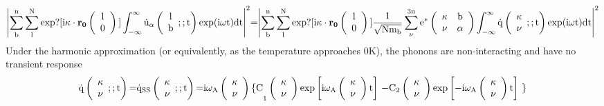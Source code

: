 \documentclass{article}
\begin{document}
\[{\left|\sum^{{\rm n}}_{{\rm b}}{\sum^{{\rm N}}_{{\rm l}}{{\rm exp}?{\rm [i}{\mathbf \kappa }\cdot {{\mathbf r}}_{{\mathbf 0}}\left( \begin{array}{c}
{\rm l} \\ 
0 \end{array}
\right){\rm ]}\int^{\infty }_{{\rm -}\infty }{{\dot{{\rm u}}}_{\alpha }\left( \begin{array}{c}
{\rm l} \\ 
{\rm b} \end{array}
;;{\rm t}\right){\rm exp(i}\omega {\rm t)dt}}}}\right|}^{{\rm 2}}{\rm =}{\left|\sum^{{\rm n}}_{{\rm b}}{\sum^{{\rm N}}_{{\rm l}}{{\rm exp}?{\rm [i}{\mathbf \kappa }\cdot {{\mathbf r}}_{{\mathbf 0}}\left( \begin{array}{c}
{\rm l} \\ 
0 \end{array}
\right){\rm ]}\frac{{\rm 1}}{\sqrt{{\rm N}{{\rm m}}_{{\rm b}}}}\sum^{{\rm 3n}}_{\nu }{{{\rm e}}^{{\rm *}}\left( \begin{array}{cc}
{\mathbf \kappa } & {\rm b} \\ 
\nu  & \alpha  \end{array}
\right)\int^{\infty }_{{\rm -}\infty }{\dot{{\rm q}}\left( \begin{array}{c}
{\mathbf \kappa } \\ 
\nu  \end{array}
;;{\rm t}\right){\rm exp(i}\omega {\rm t)dt}}}}}\right|}^{{\rm 2}}\] 
Under the harmonic approximation (or equivalently, as the temperature approaches 0K), the phonons are non-interacting and have no transient response
\[\dot{{\rm q}}\left( \begin{array}{c}
{\mathbf \kappa } \\ 
\nu  \end{array}
;;{\rm t}\right){\rm =}{\dot{{\rm q}}}_{{\rm SS}}\left( \begin{array}{c}
{\mathbf \kappa } \\ 
\nu  \end{array}
;;{\rm t}\right){\rm =}{{\rm i}{\omega }_{{\rm A}}\left( \begin{array}{c}
{\mathbf \kappa } \\ 
\nu  \end{array}
\right)\{{\rm C}}_{{\rm 1}}\left( \begin{array}{c}
{\mathbf \kappa } \\ 
\nu  \end{array}
\right){\exp  \left[{\rm i}{\omega }_{{\rm A}}\left( \begin{array}{c}
{\mathbf \kappa } \\ 
\nu  \end{array}
\right){\rm t}\right]\ }{\rm -}{{\rm C}}_{{\rm 2}}\left( \begin{array}{c}
{\mathbf \kappa } \\ 
\nu  \end{array}
\right){\exp  \left[{\rm -}{\rm i}{\omega }_{{\rm A}}\left( \begin{array}{c}
{\mathbf \kappa } \\ 
\nu  \end{array}
\right){\rm t}\right]\ }\}\] 
\end{document}
